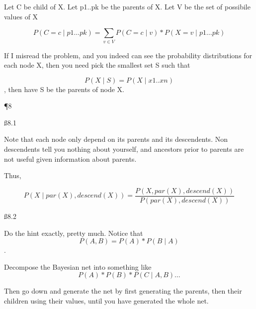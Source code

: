 Let C be child of X. Let p1..pk be the parents of X. Let V be the set of possibile values of X

\[P(C=c \mid p1\dots pk) = \sum_{v \in V} P(C=c \mid v)*P(X=v \mid p1\dots pk)\]

If I misread the problem, and you indeed can see the probability distributions for each node X, then you need pick the smallest set S such that

\[
P(X \mid S) = P(X \mid x1..xn)\], then have S be the parents of node X.

\P 8

\ss{8.1}

Note that each node only depend on its parents and its descendents. Non descendents tell you nothing about yourself, and ancestors prior to parents are not useful given information about parents.

Thus, 

\[ P(X \mid par(X), descend(X)) = \frac{P(X, par(X), descend(X))}{ P(par(X), descend(X))}
\]

\ss{8.2}

Do the hint exactly, pretty much. Notice that
\[ P(A,B) = P(A)*P(B \mid A)\].

Decompose the Bayesian net into something like 
\[P(A) * P(B) * P(C \mid A,B) \dots\]

Then go down and generate the net by first generating the parents, then their children using their values, until you have generated the whole net.


